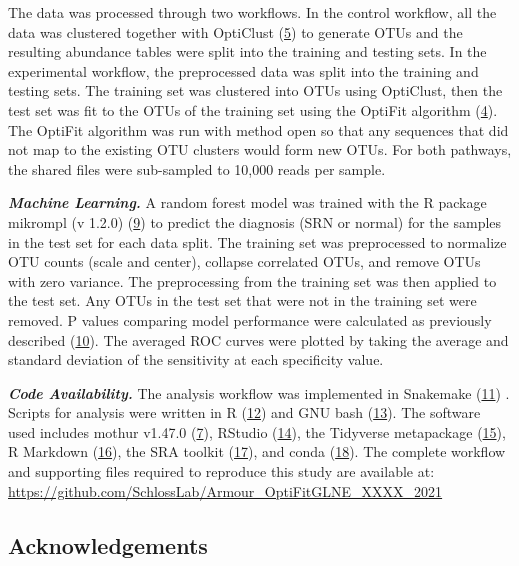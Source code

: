 \documentclass[
]{article}
\begin{document}
The data was processed through two workflows. In the control workflow,
all the data was clustered together with OptiClust
(\protect\hyperlink{ref-westcott2017}{5}) to generate OTUs and the
resulting abundance tables were split into the training and testing
sets. In the experimental workflow, the preprocessed data was split into
the training and testing sets. The training set was clustered into OTUs
using OptiClust, then the test set was fit to the OTUs of the training
set using the OptiFit algorithm
(\protect\hyperlink{ref-sovacool2022}{4}). The OptiFit algorithm was run
with method open so that any sequences that did not map to the existing
OTU clusters would form new OTUs. For both pathways, the shared files
were sub-sampled to 10,000 reads per sample.

\textbf{\emph{Machine Learning.}} A random forest model was trained with
the R package mikrompl (v 1.2.0)
(\protect\hyperlink{ref-topuxe7uoglu2021}{9}) to predict the diagnosis
(SRN or normal) for the samples in the test set for each data split. The
training set was preprocessed to normalize OTU counts (scale and
center), collapse correlated OTUs, and remove OTUs with zero variance.
The preprocessing from the training set was then applied to the test
set. Any OTUs in the test set that were not in the training set were
removed. P values comparing model performance were calculated as
previously described (\protect\hyperlink{ref-topuxe7uoglu2020}{10}). The
averaged ROC curves were plotted by taking the average and standard
deviation of the sensitivity at each specificity value.

\textbf{\emph{Code Availability.}} The analysis workflow was implemented
in Snakemake (\protect\hyperlink{ref-koster2012}{11}) . Scripts for
analysis were written in R (\protect\hyperlink{ref-R2020}{12}) and GNU
bash (\protect\hyperlink{ref-GNUbash}{13}). The software used includes
mothur v1.47.0 (\protect\hyperlink{ref-schloss2009}{7}), RStudio
(\protect\hyperlink{ref-RStudio2019}{14}), the Tidyverse metapackage
(\protect\hyperlink{ref-wickham2019}{15}), R Markdown
(\protect\hyperlink{ref-xie_r_2018}{16}), the SRA toolkit
(\protect\hyperlink{ref-noauthor_sra-tools_nodate}{17}), and conda
(\protect\hyperlink{ref-noauthor_anaconda_2016}{18}). The complete
workflow and supporting files required to reproduce this study are
available at:
\url{https://github.com/SchlossLab/Armour_OptiFitGLNE_XXXX_2021}

\hypertarget{acknowledgements}{%
\subsection{Acknowledgements}\label{acknowledgements}}
\end{document}
